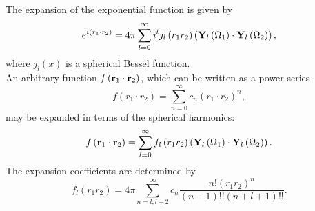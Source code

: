 The expansion of the exponential function is given by
\begin{equation}
e^{i\left(r_{1} \cdot r_{2}\right)}=4 \pi \sum_{l=0}^{\infty} i^{l} j_{l}\left(r_{1} r_{2}\right)\left(\mathbf{Y}_{l}\left(\Omega_{1}\right) \cdot \mathbf{Y}_{l}\left(\Omega_{2}\right)\right), \label{eq:5:17:14}
\end{equation}
where $j_l(x)$ is a spherical Bessel function.\\
An arbitrary function $f\left(\mathbf{r}_{1} \cdot \mathbf{r}_{2}\right)$, which can be written as a power series
\begin{equation}
f\left(r_{1} \cdot r_{2}\right)=\sum_{n=0}^{\infty} c_{n}\left(r_{1} \cdot r_{2}\right)^{n}, \label{eq:5:17:15}
\end{equation}
may be expanded in terms of the spherical harmonics:
\begin{equation}
f\left(\mathbf{r}_{1} \cdot \mathbf{r}_{2}\right)=\sum_{l=0}^{\infty} f_{l}\left(r_{1} r_{2}\right)\left(\mathbf{Y}_{l}\left(\Omega_{1}\right) \cdot \mathbf{Y}_{l}\left(\Omega_{2}\right)\right). \label{eq:5:17:16}
\end{equation}
The expansion coefficients are determined by
\begin{equation}
f_{l}\left(r_{1} r_{2}\right)=4 \pi \sum_{n=l, l+2}^{\infty} c_{n} \frac{n!\left(r_{1} r_{2}\right)^{n}}{(n-1)!!(n+l+1)!!}. \label{eq:5:17:17}
\end{equation}
